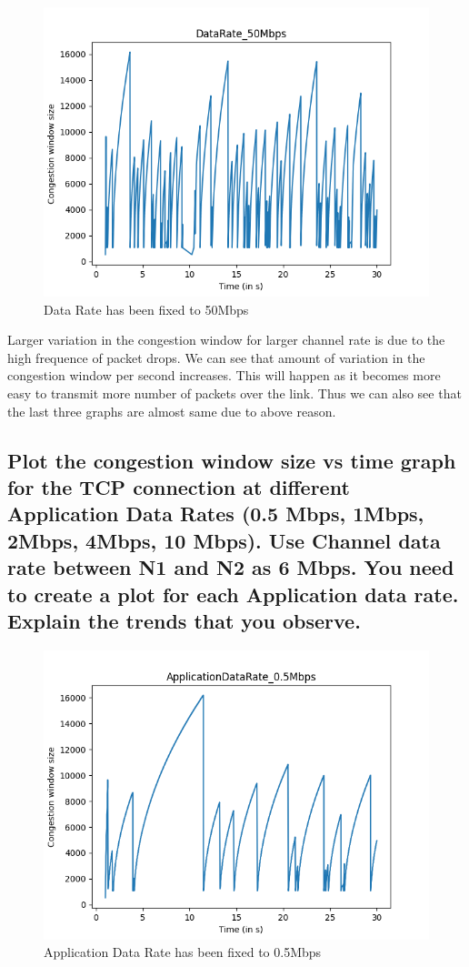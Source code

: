 \documentclass{article}
\begin{document}
\begin{figure}[H]
    \centering
    \includegraphics[scale = 0.8]{Q2/outputs/plots/DataRate_50Mbps.png}
    \caption{Data Rate has been fixed to 50Mbps}
\end{figure}


Larger variation in the congestion window for larger channel rate is due to the high frequence of packet drops. We can see that amount of variation in the congestion window per second increases. This will happen as it becomes more easy to transmit more number of packets over the link. Thus we can also see that the last three graphs are almost same due to above reason.


\subsection{Plot the congestion window size vs time graph for the TCP connection at different
Application Data Rates (0.5 Mbps, 1Mbps, 2Mbps, 4Mbps, 10 Mbps). Use Channel
data rate between N1 and N2 as 6 Mbps. You need to create a plot for each
Application data rate. Explain the trends that you observe.}

\begin{figure}[H]
    \centering
    \includegraphics[scale = 0.8]{Q2/outputs/plots/ApplicationDataRate_0.5Mbps.png}
    \caption{Application Data Rate has been fixed to 0.5Mbps}
\end{figure}
\end{document}
